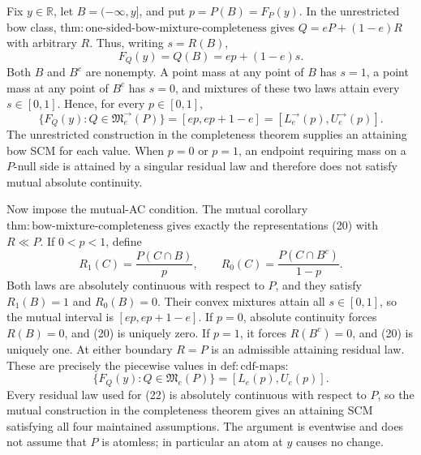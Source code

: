 Fix \(y\in\mathbb R\), let \(B=(-\infty,y]\), and put \(p=P(B)=F_P(y)\).  In the unrestricted bow class, \(\mathrm{thm:one\text{-}sided\text{-}bow\text{-}mixture\text{-}completeness}\) gives \(Q=eP+(1-e)R\) with arbitrary \(R\).  Thus, writing \(s=R(B)\),
\[
 F_Q(y)=Q(B)=ep+(1-e)s. \tag{20}
\]
Both \(B\) and \(B^c\) are nonempty.  A point mass at any point of \(B\) has \(s=1\), a point mass at any point of \(B^c\) has \(s=0\), and mixtures of these two laws attain every \(s\in[0,1]\).  Hence, for every \(p\in[0,1]\),
\[
 \{F_Q(y):Q\in\mathfrak M^{\to}_e(P)\}
 =[ep,ep+1-e]=[L^{\to}_e(p),U^{\to}_e(p)]. \tag{21}
\]
The unrestricted construction in the completeness theorem supplies an attaining bow SCM for each value.  When \(p=0\) or \(p=1\), an endpoint requiring mass on a \(P\)-null side is attained by a singular residual law and therefore does not satisfy mutual absolute continuity.

Now impose the mutual-AC condition.  The mutual corollary \(\mathrm{thm:bow\text{-}mixture\text{-}completeness}\) gives exactly the representations (20) with \(R\ll P\).  If \(0<p<1\), define
\[
 R_1(C)=\frac{P(C\cap B)}p,
 \qquad
 R_0(C)=\frac{P(C\cap B^c)}{1-p}.
\]
Both laws are absolutely continuous with respect to \(P\), and they satisfy \(R_1(B)=1\) and \(R_0(B)=0\).  Their convex mixtures attain all \(s\in[0,1]\), so the mutual interval is \([ep,ep+1-e]\).  If \(p=0\), absolute continuity forces \(R(B)=0\), and (20) is uniquely zero.  If \(p=1\), it forces \(R(B^c)=0\), and (20) is uniquely one.  At either boundary \(R=P\) is an admissible attaining residual law.  These are precisely the piecewise values in \(\mathrm{def:cdf\text{-}maps}\):
\[
 \{F_Q(y):Q\in\mathfrak M_e(P)\}=[L_e(p),U_e(p)]. \tag{22}
\]
Every residual law used for (22) is absolutely continuous with respect to \(P\), so the mutual construction in the completeness theorem gives an attaining SCM satisfying all four maintained assumptions.  The argument is eventwise and does not assume that \(P\) is atomless; in particular an atom at \(y\) causes no change.